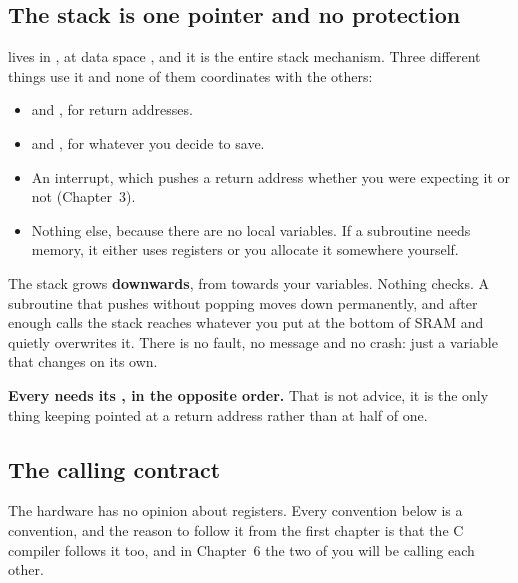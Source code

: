 \subsection{The stack is one pointer and no protection}
\label{c2:sec:stack}
 lives in , at data space , and it is the entire stack
mechanism. Three different things use it and none of them coordinates with the others:
\begin{itemize}
  \item {} and , for return addresses.
  \item {} and , for whatever you decide to save.
  \item An interrupt, which pushes a return address whether you were expecting it or not
    (Chapter~3).
  \item Nothing else, because there are no local variables. If a subroutine needs memory, it
    either uses registers or you allocate it somewhere yourself.
\end{itemize}

The stack grows \textbf{downwards}, from  towards your variables. Nothing checks. A
subroutine that pushes without popping moves  down permanently, and after enough calls the
stack reaches whatever you put at the bottom of SRAM and quietly overwrites it. There is no fault,
no message and no crash: just a variable that changes on its own.

\textbf{Every  needs its , in the opposite order.} That is not advice, it is
the only thing keeping  pointed at a return address rather than at half of one.

\subsection{The calling contract}
\label{c2:sec:contract}
The hardware has no opinion about registers. Every convention below is a convention, and the
reason to follow it from the first chapter is that the C compiler follows it too, and in
Chapter~6 the two of you will be calling each other.


